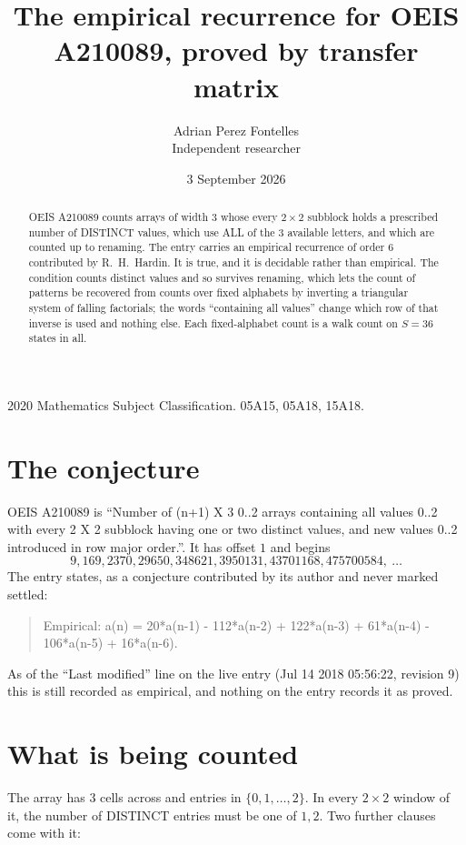 \documentclass[11pt,a4paper]{article}
\title{The empirical recurrence for OEIS A210089, proved by transfer matrix}
\author{Adrian Perez Fontelles\\ \small Independent researcher}
\date{3 September 2026}
\theoremstyle{plain}
\theoremstyle{definition}
\begin{document}
\maketitle

\begin{abstract}
OEIS A210089 counts arrays of width $3$ whose every $2\times2$ subblock holds a
prescribed number of DISTINCT values, which use ALL of the $3$ available letters, and which
are counted up to renaming. The entry carries an empirical recurrence of order $6$
contributed by R.~H.~Hardin. It is true, and it is decidable rather than empirical. The
condition counts distinct values and so survives renaming, which lets the count of patterns be
recovered from counts over fixed alphabets by inverting a triangular system of falling
factorials; the words ``containing all values'' change which row of that inverse is used and
nothing else. Each fixed-alphabet count is a walk count on $S=36$ states in all.
\end{abstract}

\noindent\small 2020 Mathematics Subject Classification. 05A15, 05A18, 15A18.\normalsize

\section{The conjecture}

OEIS A210089 is ``Number of (n+1) X 3 0..2 arrays containing all values 0..2 with every 2 X 2 subblock having one or two distinct values, and new values 0..2 introduced in row major order.''. It has offset $1$ and begins
\[
9, 169, 2370, 29650, 348621, 3950131, 43701168, 475700584,\ \dots
\]
The entry states, as a conjecture contributed by its author and never marked settled:
\begin{quote}
Empirical: a(n) = 20*a(n-1) - 112*a(n-2) + 122*a(n-3) + 61*a(n-4) - 106*a(n-5) + 16*a(n-6).
\end{quote}
As of the ``Last modified'' line on the live entry (Jul 14 2018 05:56:22, revision 9) this is still
recorded as empirical, and nothing on the entry records it as proved.

\section{What is being counted}

The array has $3$ cells across and entries in $\{0,1,\dots,2\}$. In every
$2\times2$ window of it, the number of DISTINCT entries must be one of $1, 2$. Two
further clauses come with it:
\end{document}
